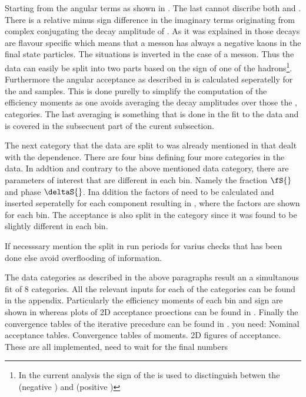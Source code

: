 Starting from the angular \pdf terms as shown in . The last cannot discribe both \BsJpsiKst and \BsbarJpsiKst. 
There is a relative minus sign difference in the imaginary terms originating from complex conjugating the decay amplitude of 
\BsJpsiKst. As it was explained in  those decays are flavour specific which means that a \Bs messon
has always a negative kaons in the final state particles. The situations is inverted in the case of a \Bsb messon.
Thus the data can easily be split into two parts based on the sign of one of the hadrons\footnote{In the current analysis the sign
of the \kaon is used to disctinguish betwen the \BsJpsiKst (negative \kaon) and \BsbarJpsiKst (positive \kaon) }. Furthermore
the angular acceptance as described in  is calculated seperatelly for the \BsJpsiKst and \BsbarJpsiKst samples.
This is done purelly to simplify the computation of the efficiency moments as one avoids averaging the decay amplitudes over those
the \BsJpsiKst, \BsbarJpsiKst categories. The last averaging is something that is done in the fit to the data and is covered in 
the subsecuent part of the curent subsection.

The next category that the data are split to was already mentioned in  that dealt with the \mkpi dependence. 
There are four \mkpi bins defining four more categories in the data. In addtion and contrary to the above mentioned data category, there 
are parameters of interest that are different in each \mkpi bin. Namely the \swave fraction $\fS{}$ and phase $\deltaS{}$.
Ina ddition the \CSP factors of  need to be calculated and inserted seperatelly for each component \pdf resulting in
, where the \CSP factors are shown for each \mkpi bin. The acceptance is also split in the \mkpi category since it was
found to be slightly different in each \mkpi bin.

{ \color{red} If necesssary mention the split in run periods for varius checks that has been done else avoid overflooding of information.}

The data categories as described in the above paragraphs result an a simultanous fit of 8 categories. 
All the relevant inputs for each of the categories can be found in the appendix. Particularly the efficiency moments 
of each \mkpi bin and \kaon sign are shown in  whereas plots of 2D acceptance proections can be found in \figref{}.
Finally the convergence tables of the iterative precedure can be found in \tabref{}.
{\color{red} you need: Nominal acceptance tables. Convergence tables of moments. 2D figures of acceptance.
These are all implemented, need to wait for the final numbers}

